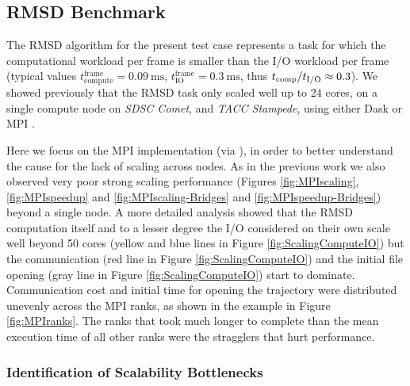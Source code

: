 \label{impl_exp}

\subsection{RMSD Benchmark}
\label{sec:RMSD}
The RMSD algorithm for the present test case represents a task for which the computational workload per frame is smaller than the I/O workload per frame (typical values $t_{\text{compute}}^{\text{frame}} = 0.09\ \text{ms}$, $t_{\text{IO}}^{\text{frame}} = 0.3\ \text{ms}$, thus ${t}_{\text{comp}}/{t}_{\text{I/O}} \approx 0.3$). 
We showed previously that the RMSD task only scaled well up to 24 cores, on a single compute node on \emph{SDSC Comet}, and \emph{TACC Stampede}, using either Dask or MPI \cite{Khoshlessan:2017ab}.

Here we focus on the MPI implementation (via  \cite{Dalcin:2011aa, Dalcin:2005aa}), in order to better understand the cause for the lack of scaling across nodes.
As in the previous work we also observed very poor strong scaling performance (Figures \ref{fig:MPIscaling}, \ref{fig:MPIspeedup} and \ref{fig:MPIscaling-Bridges} and \ref{fig:MPIspeedup-Bridges}) beyond a single node.
A more detailed analysis showed that the RMSD computation itself and to a lesser degree the I/O considered on their own scale well beyond 50 cores (yellow and blue lines in Figure \ref{fig:ScalingComputeIO}) but the communication (red line in Figure \ref{fig:ScalingComputeIO}) and the initial file opening (gray line in Figure \ref{fig:ScalingComputeIO}) start to dominate.
Communication cost and initial time for opening the trajectory were distributed unevenly across the MPI ranks, as shown in the example in Figure \ref{fig:MPIranks}. 
The ranks that took much longer to complete than the mean execution time of all other ranks were the stragglers that hurt performance.

\subsubsection*{Identification of Scalability Bottlenecks}


